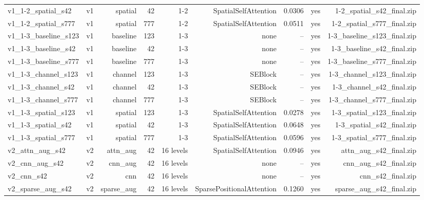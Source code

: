 \begin{table}[t]
\begin{tabular}{lrrrrrrrr}
v1\_1-2\_spatial\_s42 & v1 & spatial & 42 & 1-2 & SpatialSelfAttention & 0.0306 & yes & 1-2\_spatial\_s42\_final.zip \\
v1\_1-2\_spatial\_s777 & v1 & spatial & 777 & 1-2 & SpatialSelfAttention & 0.0511 & yes & 1-2\_spatial\_s777\_final.zip \\
v1\_1-3\_baseline\_s123 & v1 & baseline & 123 & 1-3 & none & -- & yes & 1-3\_baseline\_s123\_final.zip \\
v1\_1-3\_baseline\_s42 & v1 & baseline & 42 & 1-3 & none & -- & yes & 1-3\_baseline\_s42\_final.zip \\
v1\_1-3\_baseline\_s777 & v1 & baseline & 777 & 1-3 & none & -- & yes & 1-3\_baseline\_s777\_final.zip \\
v1\_1-3\_channel\_s123 & v1 & channel & 123 & 1-3 & SEBlock & -- & yes & 1-3\_channel\_s123\_final.zip \\
v1\_1-3\_channel\_s42 & v1 & channel & 42 & 1-3 & SEBlock & -- & yes & 1-3\_channel\_s42\_final.zip \\
v1\_1-3\_channel\_s777 & v1 & channel & 777 & 1-3 & SEBlock & -- & yes & 1-3\_channel\_s777\_final.zip \\
v1\_1-3\_spatial\_s123 & v1 & spatial & 123 & 1-3 & SpatialSelfAttention & 0.0278 & yes & 1-3\_spatial\_s123\_final.zip \\
v1\_1-3\_spatial\_s42 & v1 & spatial & 42 & 1-3 & SpatialSelfAttention & 0.0648 & yes & 1-3\_spatial\_s42\_final.zip \\
v1\_1-3\_spatial\_s777 & v1 & spatial & 777 & 1-3 & SpatialSelfAttention & 0.0596 & yes & 1-3\_spatial\_s777\_final.zip \\
v2\_attn\_aug\_s42 & v2 & attn\_aug & 42 & 16 levels & SpatialSelfAttention & 0.0946 & yes & attn\_aug\_s42\_final.zip \\
v2\_cnn\_aug\_s42 & v2 & cnn\_aug & 42 & 16 levels & none & -- & yes & cnn\_aug\_s42\_final.zip \\
v2\_cnn\_s42 & v2 & cnn & 42 & 16 levels & none & -- & yes & cnn\_s42\_final.zip \\
v2\_sparse\_aug\_s42 & v2 & sparse\_aug & 42 & 16 levels & SparsePositionalAttention & 0.1260 & yes & sparse\_aug\_s42\_final.zip \\
\bottomrule
\end{tabular}
\end{table}
